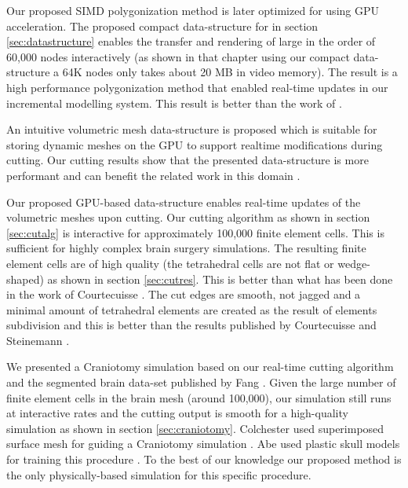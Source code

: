 Our proposed SIMD polygonization method is later optimized for using GPU acceleration. The 
proposed compact data-structure for \blob in section \ref{sec:datastructure} enables the transfer and 
rendering of large \blob in the order of 60,000 nodes interactively (as shown in that chapter using our 
compact data-structure a 64K nodes \blob only takes about 20 MB in video memory).  The result is a 
high performance polygonization method that enabled real-time updates in our incremental modelling 
system. This result is better than the work of \cite{Knoll2007, Yang2010, singh2010real, chochlik2012gpu}.
 
An intuitive volumetric mesh data-structure is proposed which is suitable for storing dynamic meshes on 
the GPU to support realtime modifications during cutting. Our cutting results show that the presented 
data-structure is more performant and can benefit the related work in this domain 
\cite{Wu2004,Wu2005, Courtecuisse2010a}.

Our proposed GPU-based data-structure enables real-time updates of the volumetric meshes upon 
cutting. Our cutting algorithm as shown in section \ref{sec:cutalg} is interactive for approximately 100,000 finite 
element cells. This is sufficient for highly complex brain surgery simulations. The resulting finite element 
cells are of high quality (the tetrahedral cells are not flat or wedge-shaped) as shown in section \ref{sec:cutres}. 
This is better than what has been done in the work of Courtecuisse \etal \cite{Courtecuisse2010a}.
The cut edges are smooth, not jagged and a minimal amount of tetrahedral elements are 
created as the result of elements subdivision and this is better than the results published by Courtecuisse
\etal and Steinemann \etal \cite{Courtecuisse2010a, Steinemann}. 


We presented a Craniotomy simulation based on our real-time cutting algorithm and the segmented 
brain data-set published by Fang \etal \cite{fang2010mesh}. 
Given the large number of finite element cells in the brain mesh (around 100,000), our 
simulation still runs at interactive rates and the cutting output is smooth for a high-quality simulation 
as shown in section \ref{sec:craniotomy}. Colchester \etal used superimposed surface mesh for 
guiding a Craniotomy simulation \cite{Coichester}. Abe \etal used plastic skull models for 
training this procedure \cite{Abe1998}. To the best of our knowledge our proposed method is the only 
physically-based simulation for this specific procedure. 




